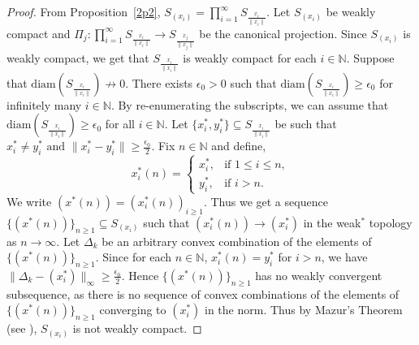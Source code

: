 \documentclass[12pt]{amsart}
\theoremstyle{definition}
\numberwithin{equation}{section}
\begin{document}
\begin{proof}
From Proposition~\ref{2p2}, $S_{(x_i)} = \prod_{i=1}^{\infty} S_{\frac{x_i}{\|x_{i}\|}}$. Let $S_{(x_i)}$ be weakly compact and $\Pi_{j}:\prod_{i=1}^{\infty}S_{\frac{x_{i}}{\|x_{i}\|}}\rightarrow S_{\frac{x_{j}}{\|x_{j}\|}}$ be the canonical projection. Since $S_{(x_i)}$ is weakly compact, we get that $S_{\frac{x_i}{\|x_i\|}}$ is weakly compact for each $i\in\mathbb{N}$. Suppose that $\text{diam}\left(S_\frac{x_{i}}{\|x_{i}\|}\right)\not\to0$. There exists $\epsilon_{0}>0$ such that $\text{diam}\left(S_\frac{x_{i}}{\|x_{i}\|}\right)\geq\epsilon_0$ for infinitely many $i\in\mathbb{N}$. By re-enumerating the subscripts, we can  assume that $\text{diam}\left(S_\frac{x_{i}}{\|x_{i}\|}\right)\geq\epsilon_0$ for all $i\in\mathbb{N}$. Let $\{x_{i}^*,y_{i}^*\}\subseteq S_\frac{x_{i}}{\|x_{i}\|}$ be such that $x_{i}^*\neq y_{i}^* \text{ and } \|x_{i}^*-y_{i}^*\|\geq\frac{\epsilon_0}{2}$. Fix $n\in \mathbb{N}$ and define,\\
\[
x^*_{i}(n) =
\begin{cases} 
    x^*_{i}, & \text{if } 1\leq i \leq n, \\
    y^*_{i}, & \text{if } i > n.
\end{cases}
\]
 We write $(x^*(n))=(x^*_{i}(n))_{i\geq1}$. Thus we get a sequence $\{(x^*(n))\}_{n\geq1}\subseteq S_{(x_{i})}$ such that $(x^*_{i}(n))\rightarrow (x^*_{i})$ in the weak$^*$ topology as $n\to \infty$. Let $\Delta_{k}$ be an arbitrary convex combination of the elements of $\{(x^*(n))\}_{n\geq1}$. Since for each $n\in\mathbb{N}$, $x^*_{i}(n)=y_{i}^*$ for $i>n$, we have $\|\Delta_{k}-(x^*_{i})\|_{\infty}\geq\frac{\epsilon_0}{2}$.
Hence $\{(x^*(n))\}_{n\geq1}$ has no weakly convergent subsequence, as there is no sequence of convex combinations of the elements of $\{(x^*(n))\}_{n\geq1}$ converging to $(x^*_{i})$ in the norm. Thus by Mazur's Theorem (see \cite[Theorem~3.13]{RW}), $S_{(x_{i})}$ is not weakly compact.


\end{proof}
\end{document}
